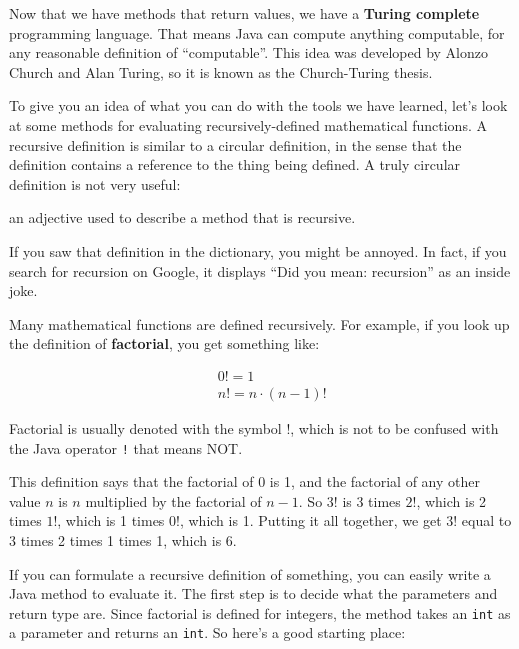 \documentclass[12pt]{book}
\newcommand{\term}[1]{%
\index{#1}
\item[#1:]}
\theoremstyle{exercise}
\newcommand{\java}[1]{\verb"#1"}
\newcommand{\java}[1]{\lstinline{#1}} %
\begin{document}
Now that we have methods that return values, we have a {\bf Turing complete} programming language.
That means Java can compute anything computable, for any reasonable definition of ``computable''.
This idea was developed by Alonzo Church and Alan Turing, so it is known as the Church-Turing thesis.

To give you an idea of what you can do with the tools we have learned, let's look at some methods for evaluating recursively-defined mathematical functions.
A recursive definition is similar to a circular definition, in the sense that the definition contains a reference to the thing being defined.
A truly circular definition is not very useful:

\begin{description}
\term{recursive} an adjective used to describe a method that is recursive.
\end{description}

If you saw that definition in the dictionary, you might be annoyed.
In fact, if you search for recursion on Google, it displays ``Did you mean: recursion'' as an inside joke.


Many mathematical functions are defined recursively.
For example, if you look up the definition of {\bf factorial}, you get something like:

\vspace{-1ex}
\begin{eqnarray*}
&&  0! = 1 \\
&&  n! = n \cdot(n-1)!
\end{eqnarray*}
\vspace{-1ex}

Factorial is usually denoted with the symbol $!$, which is not to be confused with the Java operator \java{!} that means NOT.

This definition says that the factorial of 0 is 1, and the factorial of any other value $n$ is $n$ multiplied by the factorial of $n-1$.
So $3!$ is 3 times $2!$, which is 2 times $1!$, which is 1 times $0!$, which is 1.
Putting it all together, we get $3!$ equal to 3 times 2 times 1 times 1, which is 6.

If you can formulate a recursive definition of something, you can easily write a Java method to evaluate it.
The first step is to decide what the parameters and return type are.
Since factorial is defined for integers, the method takes an \java{int} as a parameter and returns an \java{int}.
So here's a good starting place:
\end{document}
